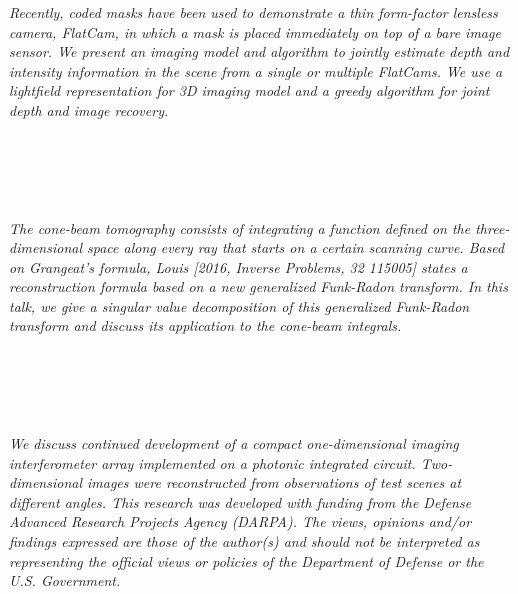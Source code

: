 \begin{multicols}{2}
\\ 
        \\
        \\\\
\\
      \textit{Recently, coded masks have been used to demonstrate a thin form-factor lensless camera, FlatCam, in which a mask is placed immediately on top of a bare image sensor. We present an imaging model and algorithm to jointly estimate depth and intensity information in the scene from a single or multiple FlatCams. We use a lightfield representation for 3D imaging model and a greedy algorithm for joint depth and image recovery. }\\
\\ 
        \\
        \\\\
\\
      \textit{The cone-beam tomography consists of integrating a function defined on the three-dimensional space along every ray that starts on a certain scanning curve. Based on Grangeat's formula, Louis [2016, Inverse Problems, 32 115005] states a reconstruction formula based on a new generalized Funk-Radon transform. In this talk, we give a singular value decomposition of this generalized Funk-Radon transform and discuss its application to the cone-beam integrals.}\\
\\ 
        \\
        \\\\
\\
      \textit{We discuss continued development of a compact one-dimensional imaging interferometer array implemented on a photonic integrated circuit. Two-dimensional images were reconstructed from observations of test scenes at different angles.
This research was developed with funding from the Defense Advanced Research Projects Agency (DARPA). The views, opinions and/or findings expressed are those of the author(s) and should not be interpreted as representing the official views or policies of the Department of Defense or the U.S. Government.}\\
\\ 
        \\
        \\\\

\end{multicols}
